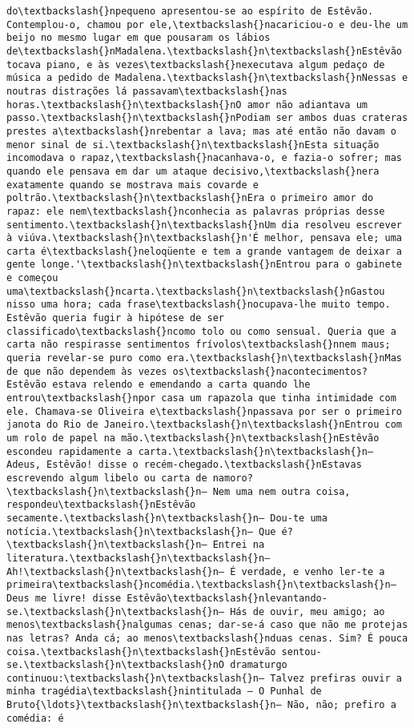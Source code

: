 \documentclass[11pt]{article}
\begin{document}
\begin{Verbatim}[commandchars=\\\{\}]
do\textbackslash{}npequeno apresentou-se ao espírito de Estêvão. Contemplou-o, chamou por ele,\textbackslash{}nacariciou-o e deu-lhe um beijo no mesmo lugar em que pousaram os lábios de\textbackslash{}nMadalena.\textbackslash{}n\textbackslash{}nEstêvão tocava piano, e às vezes\textbackslash{}nexecutava algum pedaço de música a pedido de Madalena.\textbackslash{}n\textbackslash{}nNessas e noutras distrações lá passavam\textbackslash{}nas horas.\textbackslash{}n\textbackslash{}nO amor não adiantava um passo.\textbackslash{}n\textbackslash{}nPodiam ser ambos duas crateras prestes a\textbackslash{}nrebentar a lava; mas até então não davam o menor sinal de si.\textbackslash{}n\textbackslash{}nEsta situação incomodava o rapaz,\textbackslash{}nacanhava-o, e fazia-o sofrer; mas quando ele pensava em dar um ataque decisivo,\textbackslash{}nera exatamente quando se mostrava mais covarde e poltrão.\textbackslash{}n\textbackslash{}nEra o primeiro amor do rapaz: ele nem\textbackslash{}nconhecia as palavras próprias desse sentimento.\textbackslash{}n\textbackslash{}nUm dia resolveu escrever à viúva.\textbackslash{}n\textbackslash{}n'É melhor, pensava ele; uma carta é\textbackslash{}neloqüente e tem a grande vantagem de deixar a gente longe.'\textbackslash{}n\textbackslash{}nEntrou para o gabinete e começou uma\textbackslash{}ncarta.\textbackslash{}n\textbackslash{}nGastou nisso uma hora; cada frase\textbackslash{}nocupava-lhe muito tempo. Estêvão queria fugir à hipótese de ser classificado\textbackslash{}ncomo tolo ou como sensual. Queria que a carta não respirasse sentimentos frívolos\textbackslash{}nnem maus; queria revelar-se puro como era.\textbackslash{}n\textbackslash{}nMas de que não dependem às vezes os\textbackslash{}nacontecimentos? Estêvão estava relendo e emendando a carta quando lhe entrou\textbackslash{}npor casa um rapazola que tinha intimidade com ele. Chamava-se Oliveira e\textbackslash{}npassava por ser o primeiro janota do Rio de Janeiro.\textbackslash{}n\textbackslash{}nEntrou com um rolo de papel na mão.\textbackslash{}n\textbackslash{}nEstêvão escondeu rapidamente a carta.\textbackslash{}n\textbackslash{}n— Adeus, Estêvão! disse o recém-chegado.\textbackslash{}nEstavas escrevendo algum libelo ou carta de namoro?\textbackslash{}n\textbackslash{}n— Nem uma nem outra coisa, respondeu\textbackslash{}nEstêvão secamente.\textbackslash{}n\textbackslash{}n— Dou-te uma notícia.\textbackslash{}n\textbackslash{}n— Que é?\textbackslash{}n\textbackslash{}n— Entrei na literatura.\textbackslash{}n\textbackslash{}n— Ah!\textbackslash{}n\textbackslash{}n— É verdade, e venho ler-te a primeira\textbackslash{}ncomédia.\textbackslash{}n\textbackslash{}n— Deus me livre! disse Estêvão\textbackslash{}nlevantando-se.\textbackslash{}n\textbackslash{}n— Hás de ouvir, meu amigo; ao menos\textbackslash{}nalgumas cenas; dar-se-á caso que não me protejas nas letras? Anda cá; ao menos\textbackslash{}nduas cenas. Sim? É pouca coisa.\textbackslash{}n\textbackslash{}nEstêvão sentou-se.\textbackslash{}n\textbackslash{}nO dramaturgo continuou:\textbackslash{}n\textbackslash{}n— Talvez prefiras ouvir a minha tragédia\textbackslash{}nintitulada — O Punhal de Bruto{\ldots}\textbackslash{}n\textbackslash{}n— Não, não; prefiro a comédia: é 
\end{Verbatim}
\end{document}
